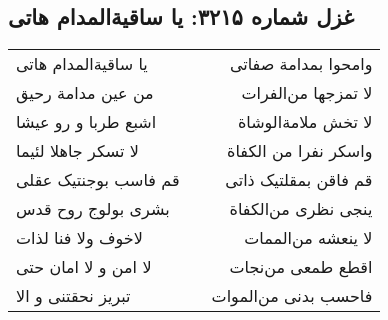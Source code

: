 \begin{center}
\section*{غزل شماره ۳۲۱۵: یا ساقیةالمدام هاتی}
\label{sec:3215}
\begin{longtable}{l p{0.5cm} r}
یا ساقیةالمدام هاتی
&&
وامحوا بمدامة صفاتی
\\
من عین مدامة رحیق
&&
لا تمزجها من‌الفرات
\\
اشبع طربا و رو عیشا
&&
لا تخش ملامةالوشاة
\\
لا تسکر جاهلا لئیما
&&
واسکر نفرا من الکفاة
\\
قم فاسب بوجنتیک عقلی
&&
قم فاقن بمقلتیک ذاتی
\\
بشری بولوج روح قدس
&&
ینجی نظری من‌الکفاة
\\
لاخوف ولا فنا لذات
&&
لا ینعشه من‌الممات
\\
لا امن و لا امان حتی
&&
اقطع طمعی من‌نجات
\\
تبریز نحقتنی و الا
&&
فاحسب بدنی من‌الموات
\\
\end{longtable}
\end{center}
